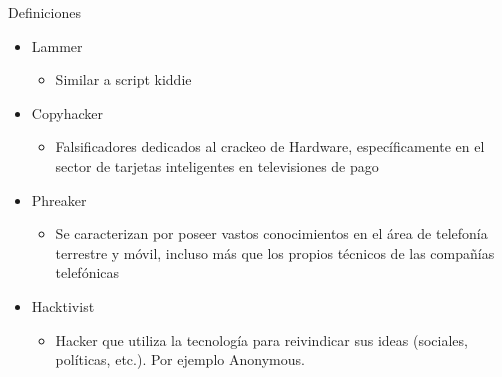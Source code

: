 \documentclass[aspectratio=169,11pt]{beamer}
\begin{document}
\begin{frame}[allowframebreaks]{Definiciones}
\small

  \begin{itemize}
    \item Lammer
     \begin{itemize}
  \item Similar a script kiddie
    \end{itemize}

  \item Copyhacker
    \begin{itemize}
  \item Falsificadores dedicados al crackeo de Hardware, específicamente en el sector de tarjetas inteligentes en televisiones de pago
    \end{itemize}

  \item Phreaker
     \begin{itemize}
  \item Se caracterizan por poseer vastos conocimientos en el área de telefonía terrestre y móvil, incluso más que los propios técnicos de las compañías telefónicas
      \end{itemize}

  \item Hacktivist
    \begin{itemize}
  \item Hacker que utiliza la tecnología para reivindicar sus ideas (sociales, políticas, etc.). Por ejemplo Anonymous.
    \end{itemize}

  \end{itemize}
\end{frame}
\end{document}
